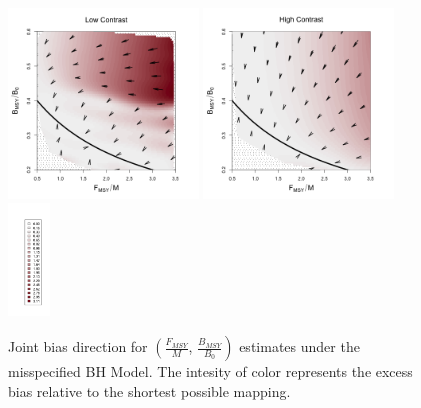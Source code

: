 \documentclass[12pt]{article}
\begin{document}
\begin{figure}[h!]
\includegraphics[width=0.45\textwidth]{../gpBias/directionalBiasSchnuteSubHHardFlatT30N150WWideN112.png}
\includegraphics[width=0.45\textwidth]{../gpBias/directionalBiasSchnuteSubExpT45N150Wide.png}
\hspace*{-1cm}
\includegraphics[width=0.1\textwidth]{../gpBias/legendSubSchnute.png}
\caption{Joint bias direction for $\left(\frac{F_{MSY}}{M}\right.$, $\left.\frac{B_{MSY}}{B_0}\right)$ estimates under the misspecified BH Model. The intesity of color represents the excess bias relative to the shortest possible mapping.}
\end{figure}
\end{document}
